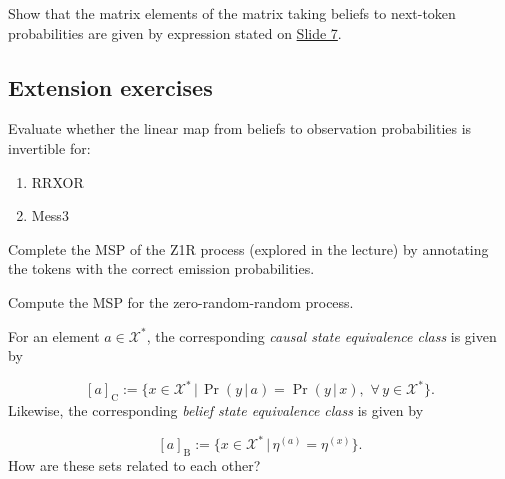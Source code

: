 \begin{exercise}
\label{ex:pred-core-5}
Show that the matrix elements of the matrix taking beliefs to next-token probabilities are given by expression stated on \href{https://drive.google.com/file/d/1IPz8Pq939VbjmVqYcYDybdJ02yvdgMGS/view?usp=sharing}{Slide 7}.
\end{exercise}

\subsection{Extension exercises}\label{sec:pred-ext}

\begin{exercise}
\label{ex:pred-ext-1}
Evaluate whether the linear map from beliefs to observation probabilities is invertible for:

\begin{enumerate}
\item
  RRXOR
\item
  Mess3
\end{enumerate}
\end{exercise}

\begin{exercise}
\label{ex:pred-ext-2}
Complete the MSP of the Z1R process (explored in the lecture) by annotating the tokens with the correct emission probabilities.
\end{exercise}

\begin{exercise}
\label{ex:pred-ext-3}
Compute the MSP for the zero-random-random process.
\end{exercise}

\begin{exercise}
\label{ex:pred-ext-4}
For an element \(a\in \mathcal{X}^*\), the corresponding \emph{causal state equivalence class} is given by

\[
[a]_{\mathrm{C}} := \{x \in \mathcal{X}^*\,|\, \Pr(y\,|\, a) = \Pr(y\,|\, x) ,\,\,\forall\,y\in\mathcal{X}^*  \} .
\]
Likewise, the corresponding \emph{belief state equivalence class} is given by

\[
[a]_{\mathrm{B}} := \{x \in \mathcal{X}^*\,|\, \eta^{(a)} = \eta^{(x)}  \} .
\]
How are these sets related to each other?
\end{exercise}
